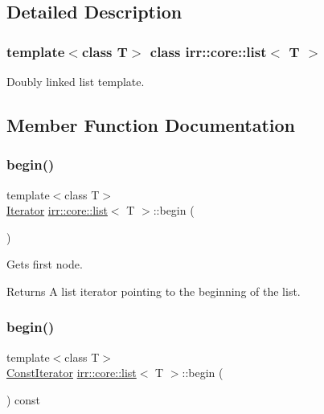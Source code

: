 \subsection{Detailed Description}
\subsubsection*{template$<$class T$>$\newline
class irr\+::core\+::list$<$ T $>$}

Doubly linked list template. 

\subsection{Member Function Documentation}
\mbox{\label{classirr_1_1core_1_1list_aebd05a0f5e5ead6e1d5b6e3973da8039}} 
\subsubsection{\texorpdfstring{begin()}{begin()}\hspace{0.1cm}{\footnotesize\ttfamily [1/2]}}
{\footnotesize\ttfamily template$<$class T$>$ \\
\hyperlink{classirr_1_1core_1_1list_1_1Iterator}{Iterator} \hyperlink{classirr_1_1core_1_1list}{irr\+::core\+::list}$<$ T $>$\+::begin (\begin{DoxyParamCaption}{ }\end{DoxyParamCaption})\hspace{0.3cm}{\ttfamily [inline]}}



Gets first node. 

\begin{DoxyReturn}{Returns}
A list iterator pointing to the beginning of the list. 
\end{DoxyReturn}
\mbox{\label{classirr_1_1core_1_1list_a9f7cba97077273eaaac4691c49cc35c1}} 
\subsubsection{\texorpdfstring{begin()}{begin()}\hspace{0.1cm}{\footnotesize\ttfamily [2/2]}}
{\footnotesize\ttfamily template$<$class T$>$ \\
\hyperlink{classirr_1_1core_1_1list_1_1ConstIterator}{Const\+Iterator} \hyperlink{classirr_1_1core_1_1list}{irr\+::core\+::list}$<$ T $>$\+::begin (\begin{DoxyParamCaption}{ }\end{DoxyParamCaption}) const\hspace{0.3cm}{\ttfamily [inline]}}



